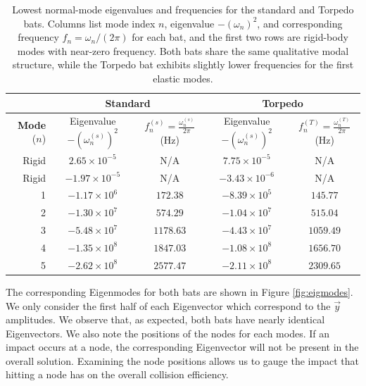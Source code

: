 \documentclass[linenumbers]{aastex7}
\begin{document}
\begin{table}[h]
    \centering
    \begin{tabular}{|r|c|c|c|c|}
        \hline
        \multicolumn{1}{|c|}{} & \multicolumn{2}{c|}{\textbf{Standard}} & \multicolumn{2}{c|}{\textbf{Torpedo}} \\
        \hline
        \textbf{Mode} ($n$) & Eigenvalue $-(\omega_n^{(s)}) ^2$ & $f_n^{(s)} = \frac{\omega_n^{(s)}}{2\pi}$ (Hz) & Eigenvalue $-(\omega_n^{(s)})^2$& $f_n^{(T)} = \frac{\omega_n^{(T)}}{2\pi}$ (Hz)\\[1.5ex]
        \hline
        Rigid & $2.65\times 10^{-5}$	& N/A &$7.75\times 10^{-5}$	& N/A \\ 
        Rigid & $-1.97\times 10^{-5}$	& N/A &$-3.43\times 10^{-6}$& N/A \\
        1 &  $-1.17 \times 10^{6}$	 & $172.38$	& $-8.39\times 10^5$	 &$ 145.77$ \\
        2 & $-1.30 \times 10^7$	& $574.29$ & $-1.04 \times 10^7$	&$ 515.04$ \\
        3 & $-5.48\times 10^7$ & $1178.63$	& $-4.43 \times 10^7$	& $1059.49$\\
        4 & $-1.35\times 10^8$	& $1847.03$ & $-1.08\times 10^8$ &	$1656.70$ \\
        5 & $-2.62\times 10^8$	& $2577.47$ & $-2.11\times 10^8$	& $2309.65$ \\
        \hline
    \end{tabular}
    \caption{Lowest normal-mode eigenvalues and frequencies for the standard and Torpedo bats. Columns list mode index $n$, eigenvalue $-(\omega_n)^2$, and corresponding frequency $f_n = \omega_n/(2\pi)$ for each bat, and the first two rows are rigid-body modes with near-zero frequency. Both bats share the same qualitative modal structure, while the Torpedo bat exhibits slightly lower frequencies for the first elastic modes.}
    \label{tab:eigvals}
\end{table}

The corresponding Eigenmodes for both bats are shown in Figure \ref{fig:eigmodes}. We only consider the first half of each Eigenvector which correspond to the $\vec{y}$ amplitudes. We observe that, as expected, both bats have nearly identical Eigenvectors. We also note the positions of the nodes for each modes. If an impact occurs at a node, the corresponding Eigenvector will not be present in the overall solution. Examining the node positions allows us to gauge the impact that hitting a node has on the overall collision efficiency. 
\end{document}
